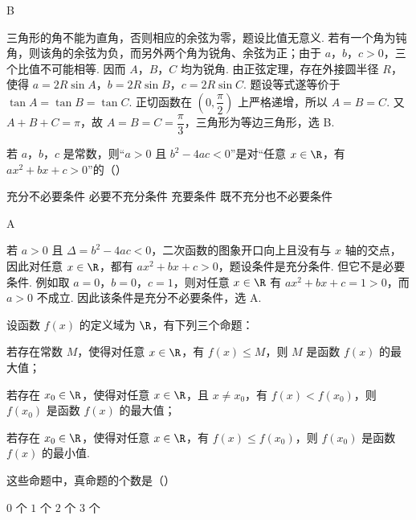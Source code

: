 \begin{answer}
B
\end{answer}

\begin{solution}
三角形的角不能为直角，否则相应的余弦为零，题设比值无意义. 若有一个角为钝角，则该角的余弦为负，而另外两个角为锐角、余弦为正；由于 \(a\)，\(b\)，\(c>0\)，三个比值不可能相等. 因而 \(A\)，\(B\)，\(C\) 均为锐角.
由正弦定理，存在外接圆半径 \(R\)，使得
\(a=2R\sin A\)，\(b=2R\sin B\)，\(c=2R\sin C\). 题设等式遂等价于
\(\tan A=\tan B=\tan C\). 正切函数在 \(\left(0,\dfrac\pi2\right)\) 上严格递增，所以
\(A=B=C\). 又 \(A+B+C=\pi\)，故
\(A=B=C=\dfrac\pi3\)，三角形为等边三角形，选 B.
\end{solution}

\begin{problem}
若 \(a\)，\(b\)，\(c\) 是常数，则“\(a > 0\) 且 \(b^2 - 4ac < 0\)”是对“任意 \(x \in \R\)，有 \(ax^2 + bx + c > 0\)”的（\quad）

\choices
    {充分不必要条件}
    {必要不充分条件}
    {充要条件}
    {既不充分也不必要条件}
\end{problem}

\begin{answer}
A
\end{answer}

\begin{solution}
若 \(a>0\) 且 \(\Delta=b^{2}-4ac<0\)，二次函数的图象开口向上且没有与 \(x\) 轴的交点，因此对任意 \(x\in\R\)，都有
\(ax^{2}+bx+c>0\)，题设条件是充分条件.
但它不是必要条件. 例如取 \(a=0\)，\(b=0\)，\(c=1\)，则对任意 \(x\in\R\) 有
\(ax^{2}+bx+c=1>0\)，而 \(a>0\) 不成立. 因此该条件是充分不必要条件，选 A.
\end{solution}

\begin{problem}
设函数 \( f(x) \) 的定义域为 \( \R \)，有下列三个命题：

\begin{circlelist}
\item 若存在常数 \(M\)，使得对任意 \(x \in \R\)，有 \(f(x) \leqslant M\)，则 \(M\) 是函数 \(f(x)\) 的最大值；
\item 若存在 \(x_0 \in \R\)，使得对任意 \(x \in \R\)，且 \(x \neq x_0\)，有 \(f(x) < f(x_0)\)，则 \(f(x_0)\) 是函数 \(f(x)\) 的最大值；
\item 若存在 \(x_0 \in \R\)，使得对任意 \(x \in \R\)，有 \(f(x) \leqslant f(x_0)\)，则 \(f(x_0)\) 是函数 \(f(x)\) 的最小值.
\end{circlelist}

这些命题中，真命题的个数是（\quad）

\choices
    {\(0\) 个}
    {\(1\) 个}
    {\(2\) 个}
    {\(3\) 个}
\end{problem}

